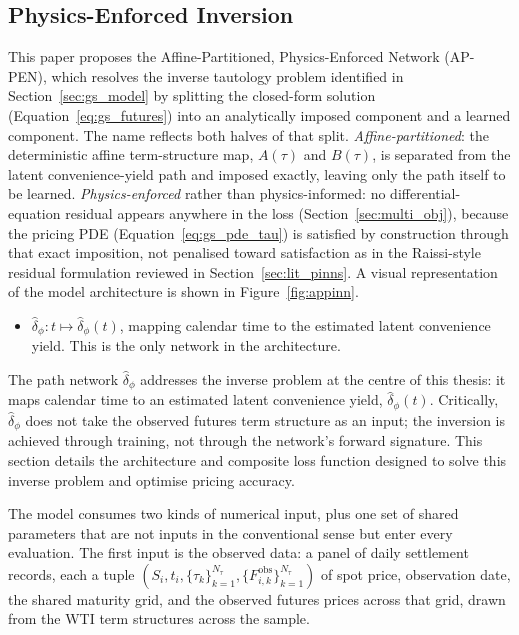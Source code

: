 \documentclass[11pt, a4paper]{article}
\begin{document}
\subsection{Physics-Enforced Inversion}
\label{sec:pinn_inversion}
This paper proposes the Affine-Partitioned, Physics-Enforced Network (AP-PEN), which resolves the inverse tautology problem identified in Section~\ref{sec:gs_model} by splitting the closed-form solution (Equation~\ref{eq:gs_futures}) into an analytically imposed component and a learned component. The name reflects both halves of that split. \emph{Affine-partitioned}: the deterministic affine term-structure map, $A(\tau)$ and $B(\tau)$, is separated from the latent convenience-yield path and imposed exactly, leaving only the path itself to be learned. \emph{Physics-enforced} rather than physics-informed: no differential-equation residual appears anywhere in the loss (Section~\ref{sec:multi_obj}), because the pricing PDE (Equation~\ref{eq:gs_pde_tau}) is satisfied by construction through that exact imposition, not penalised toward satisfaction as in the Raissi-style residual formulation reviewed in Section~\ref{sec:lit_pinns}. A visual representation of the model architecture is shown in Figure~\ref{fig:appinn}.

\begin{itemize}
    \item $\hat{\delta}_\phi: t \mapsto \hat{\delta}_\phi(t)$, mapping calendar
    time to the estimated latent convenience yield. This is the only network in
    the architecture.
\end{itemize}

The path network $\hat{\delta}_\phi$ addresses the inverse problem at the
centre of this thesis: it maps calendar time to an estimated latent
convenience yield, $\hat{\delta}_\phi(t)$. Critically, $\hat{\delta}_\phi$
does not take the observed futures term structure as an input; the
inversion is achieved through training, not through the network's forward
signature. This section details the architecture and composite
loss function designed to solve this inverse problem and optimise pricing
accuracy.

The model consumes two kinds of numerical input, plus one set of shared
parameters that are not inputs in the conventional sense but enter every
evaluation. The first input is the observed data: a panel of daily
settlement records, each a tuple $(S_i, t_i, \{\tau_k\}_{k=1}^{N_\tau}, \{F^{\text{obs}}_{i,k}\}_{k=1}^{N_\tau})$ of
spot price, observation date, the shared maturity grid, and the observed futures
prices across that grid, drawn from the WTI term structures across the sample.
\end{document}

